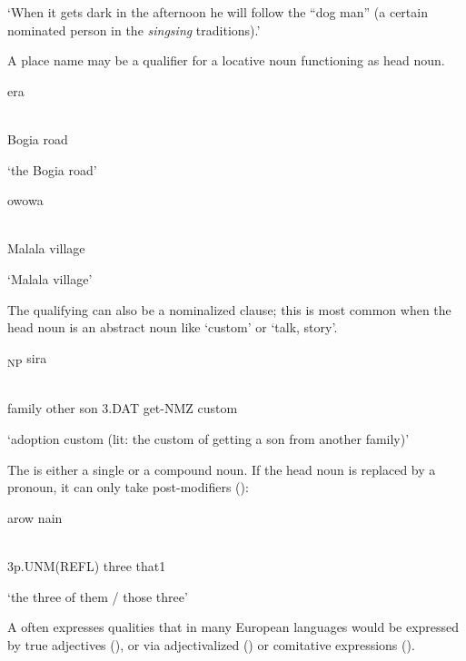 `When it gets dark in the afternoon he will follow the ``dog man'' (a certain nominated person in the \textit{singsing} traditions).'

A place name may be a qualifier for a locative noun functioning as head noun. 

\ea%
\label{ex:x834}
\gll {}  era \\
      \\
\glt
\z

Bogia  road

`the Bogia road'

\ea%
\label{ex:x833}
\gll {}  owowa \\
      \\
\glt
\z

Malala  village

`Malala village'

The qualifying  can also be a nominalized clause; this is most common when the head noun is an abstract noun like  `custom' or  `talk, story'.

\ea%
\label{ex:x414}
\textsubscript{NP}  sira \\
      \\
\glt
\z

family  other  son  3.DAT  get-NMZ  custom

`adoption custom (lit: the custom of getting a son from another family)'

The  is either a single or a compound noun.  If the head noun is replaced by a pronoun, it can only take post-modifiers ():

\ea%
\label{ex:x415}
\gll {}  arow  nain  \\
      \\
\glt
\z

3p.UNM(REFL)  three  that1

`the three of them / those three'

A  often expresses qualities that in many European languages would be expressed by true adjectives (), or via adjectivalized () or comitative expressions ().


